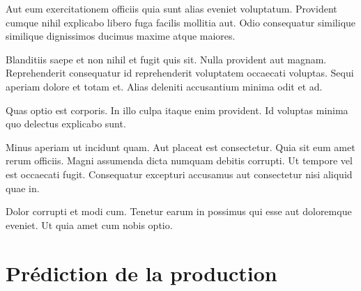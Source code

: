 \documentclass[a4paper]{article}
\begin{document}
\begin{multicols}{2}
Aut eum exercitationem officiis quia sunt alias eveniet voluptatum. Provident
    cumque nihil explicabo libero fuga facilis mollitia aut. Odio consequatur
    similique similique dignissimos ducimus maxime atque maiores.

Blanditiis saepe et non nihil et fugit quis sit. Nulla provident aut magnam.
    Reprehenderit consequatur id reprehenderit voluptatem occaecati voluptas.
    Sequi aperiam dolore et totam et. Alias deleniti accusantium minima odit et
    ad.

Quas optio est corporis. In illo culpa itaque enim provident. Id voluptas minima
    quo delectus explicabo sunt.

Minus aperiam ut incidunt quam. Aut placeat est consectetur. Quia sit eum amet
    rerum officiis. Magni assumenda dicta numquam debitis corrupti. Ut tempore
    vel est occaecati fugit. Consequatur excepturi accusamus aut consectetur
    nisi aliquid quae in.

Dolor corrupti et modi cum. Tenetur earum in possimus qui esse aut doloremque
eveniet. Ut quia amet cum nobis optio.

\end{multicols}

\clearpage
\section{Prédiction de la production}
\end{document}
